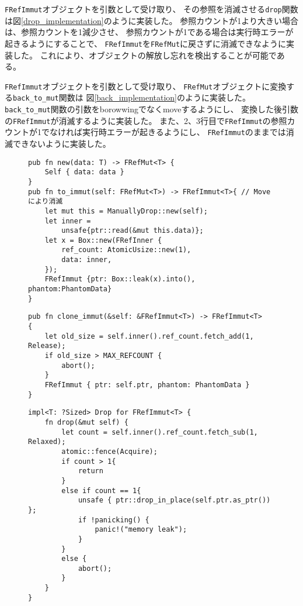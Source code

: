 \documentclass{sumiilab-paper}
\theoremstyle{mystyle}
\numberwithin{definition}{chapter} %
\begin{document}
\texttt{FRefImmut}オブジェクトを引数として受け取り、
その参照を消滅させる\texttt{drop}関数は図\ref{drop_implementation}のように実装した。
参照カウントが1より大きい場合は、参照カウントを1減少させ、
参照カウントが1である場合は実行時エラーが起きるようにすることで、
\texttt{FRefImmut}を\texttt{FRefMut}に戻さずに消滅できなように実装した。
これにより、オブジェクトの解放し忘れを検出することが可能である。

\texttt{FRefImmut}オブジェクトを引数として受け取り、
\texttt{FRefMut}オブジェクトに変換する\texttt{back\_to\_mut}関数は
図\ref{back_implementation}のように実装した。
\texttt{back\_to\_mut}関数の引数をborowwingでなくmoveするようにし、
変換した後引数の\texttt{FRefImmut}が消滅するように実装した。
また、2、3行目で\texttt{FRefImmut}の参照カウントが1でなければ実行時エラーが起きるようにし、
\texttt{FRefImmut}のままでは消滅できないように実装した。

\begin{figure}[htp]
\begin{lstlisting}[caption=関数newと関数to\_immutの実装, label=new_to_implementation, captionpos=b]
pub fn new(data: T) -> FRefMut<T> {
    Self { data: data }
}
pub fn to_immut(self: FRefMut<T>) -> FRefImmut<T>{ // Moveにより消滅
    let mut this = ManuallyDrop::new(self);
    let inner =
        unsafe{ptr::read(&mut this.data)};
    let x = Box::new(FRefInner {
        ref_count: AtomicUsize::new(1),
        data: inner,
    });
    FRefImmut {ptr: Box::leak(x).into(), phantom:PhantomData}
}
\end{lstlisting}
\end{figure}

\begin{figure}[htp]
\begin{lstlisting}[caption=関数clone\_immutの実装, label=clone_implementation, captionpos=b]
pub fn clone_immut(&self: &FRefImmut<T>) -> FRefImmut<T>
{
    let old_size = self.inner().ref_count.fetch_add(1, Release);
    if old_size > MAX_REFCOUNT {
        abort();
    }
    FRefImmut { ptr: self.ptr, phantom: PhantomData }
}
\end{lstlisting}
\end{figure}

\begin{figure}[htp]
\begin{lstlisting}[caption=関数dropの実装, label=drop_implementation, captionpos=b]
impl<T: ?Sized> Drop for FRefImmut<T> {
    fn drop(&mut self) {
        let count = self.inner().ref_count.fetch_sub(1, Relaxed);
        atomic::fence(Acquire);
        if count > 1{
            return
        }
        else if count == 1{
            unsafe { ptr::drop_in_place(self.ptr.as_ptr()) };
            if !panicking() {
                panic!("memory leak");
            }
        }
        else {
            abort();
        }
    }
}
\end{lstlisting}
\end{figure}
\end{document}
